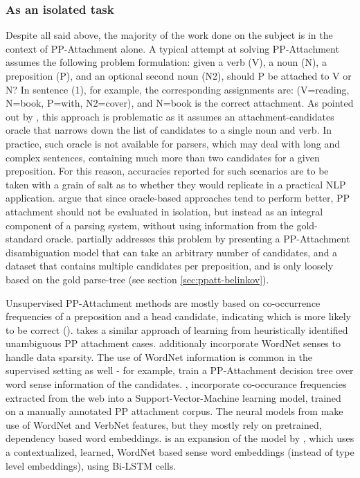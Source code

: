 \subsubsection{As an isolated task} \label{sec:ppatt_isolated}

Despite all said above, the majority of the work done on the subject is in the context of PP-Attachment alone. A typical attempt at solving PP-Attachment assumes the following problem formulation: given a verb (V), a noun (N), a preposition (P), and an optional second noun (N2), should P be attached to V or N? In sentence (1), for example, the corresponding assignments are: (V=reading, N=book, P=with, N2=cover), and N=book is the correct attachment.  As pointed out by \cite{doi:10.1162/coli.07.33.4.469}, this approach is problematic as it assumes an attachment-candidates oracle that narrows down the list of candidates to a single noun and verb. In practice, such oracle is not available for parsers, which may deal with long and complex sentences, containing much more than two candidates for a given preposition. For this reason, accuracies reported for such scenarios are to be taken with a grain of salt as to whether they would replicate in a practical NLP application. \cite{doi:10.1162/coli.07.33.4.469} argue that since oracle-based approaches tend to perform better, PP attachment should not be evaluated in isolation, but instead as an integral component of a parsing system, without using information from the gold-standard oracle. \cite{hpcd} partially addresses this problem by presenting a PP-Attachment disambiguation model that can take an arbitrary number of candidates, and a dataset that contains multiple candidates per preposition, and is only loosely based on the gold parse-tree (see section \ref{sec:ppatt-belinkov}).    

Unsupervised PP-Attachment methods are mostly based on co-occurrence frequencies of a preposition and a head candidate, indicating which is more likely to be correct (\cite{hindle-rooth-93-structural}).  \cite{ratnaparkhi-98-statistical} takes a similar approach of learning from heuristically identified unambiguous PP attachment cases.  \cite{medimi-07} additionaly incorporate WordNet senses to handle data sparsity. The use of WordNet  information is common in the supervised setting as well - \cite{stetina-nagao-97-corpus} for example, train a PP-Attachment decision tree over word sense information of the candidates. \cite{10.1007/11562214_17}, \cite{olteanu-05} incorporate co-occurance frequencies extracted from the web into a Support-Vector-Machine learning model, trained on a manually annotated PP attachment corpus. The neural models from \cite{hpcd} make use of WordNet and VerbNet features, but they mostly rely on pretrained, dependency based word embeddings. \cite{dasigi-etal-17-ontology} is an expansion of the model by \cite{hpcd}, which uses a contextualized, learned, WordNet based sense word embeddings (instead of type level embeddings), using Bi-LSTM cells.


